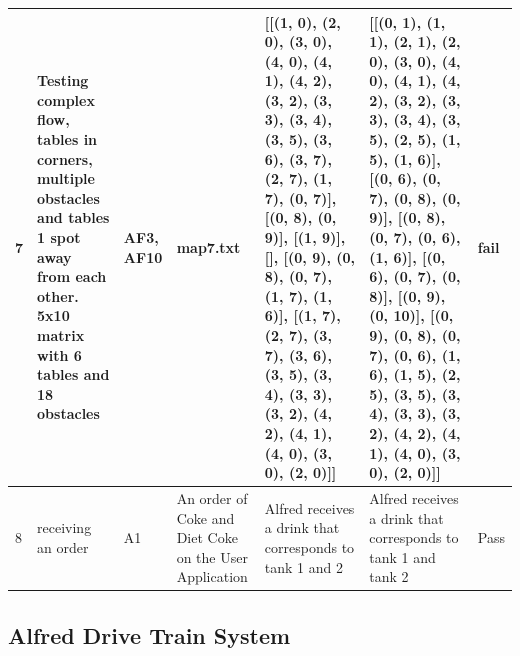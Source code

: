 \documentclass [10pt]{article}
\begin{document}
\begin{longtable}{| p{} | p{} | p{} | p{} | p{} | p{} | p{} |}
	7 &  Testing complex flow, tables in corners, multiple obstacles and tables 1 spot away from each other. 5x10 matrix with 6 tables and 18 obstacles &  AF3, AF10 &  map7.txt &  [[(1, 0), (2, 0), (3, 0), (4, 0), (4, 1), (4, 2), (3, 2), (3, 3), (3, 4), (3, 5), (3, 6), (3, 7), (2, 7), (1, 7), (0, 7)], [(0, 8), (0, 9)], [(1, 9)], [], [(0, 9), (0, 8), (0, 7), (1, 7), (1, 6)], [(1, 7), (2, 7), (3, 7), (3, 6), (3, 5), (3, 4), (3, 3), (3, 2), (4, 2), (4, 1), (4, 0), (3, 0), (2, 0)]] &  [[(0, 1), (1, 1), (2, 1), (2, 0), (3, 0), (4, 0), (4, 1), (4, 2), (3, 2), (3, 3), (3, 4), (3, 5), (2, 5), (1, 5), (1, 6)], [(0, 6), (0, 7), (0, 8), (0, 9)], [(0, 8), (0, 7), (0, 6), (1, 6)], [(0, 6), (0, 7), (0, 8)], [(0, 9), (0, 10)], [(0, 9), (0, 8), (0, 7), (0, 6), (1, 6), (1, 5), (2, 5), (3, 5), (3, 4), (3, 3), (3, 2), (4, 2), (4, 1), (4, 0), (3, 0), (2, 0)]] &  fail \\ \hline  
	8 &  receiving an order &  A1 &  An order of Coke and Diet Coke on the User Application &  Alfred receives a drink that corresponds to tank 1 and 2 &  Alfred receives a drink that corresponds to tank 1 and tank 2 & Pass \\ \hline
\end{longtable}

\subsection {Alfred Drive Train System}
\end{document}
